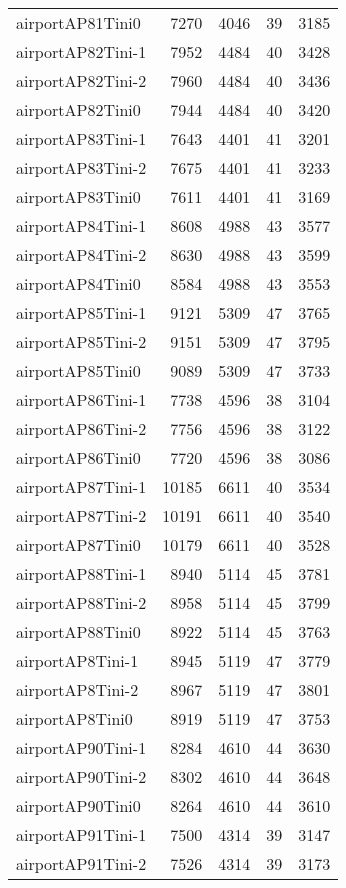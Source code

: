 \begin{longtable}{lrrrr}
airportAP81Tini0 & 7270 & 4046 & 39 & 3185 \\
airportAP82Tini-1 & 7952 & 4484 & 40 & 3428 \\
airportAP82Tini-2 & 7960 & 4484 & 40 & 3436 \\
airportAP82Tini0 & 7944 & 4484 & 40 & 3420 \\
airportAP83Tini-1 & 7643 & 4401 & 41 & 3201 \\
airportAP83Tini-2 & 7675 & 4401 & 41 & 3233 \\
airportAP83Tini0 & 7611 & 4401 & 41 & 3169 \\
airportAP84Tini-1 & 8608 & 4988 & 43 & 3577 \\
airportAP84Tini-2 & 8630 & 4988 & 43 & 3599 \\
airportAP84Tini0 & 8584 & 4988 & 43 & 3553 \\
airportAP85Tini-1 & 9121 & 5309 & 47 & 3765 \\
airportAP85Tini-2 & 9151 & 5309 & 47 & 3795 \\
airportAP85Tini0 & 9089 & 5309 & 47 & 3733 \\
airportAP86Tini-1 & 7738 & 4596 & 38 & 3104 \\
airportAP86Tini-2 & 7756 & 4596 & 38 & 3122 \\
airportAP86Tini0 & 7720 & 4596 & 38 & 3086 \\
airportAP87Tini-1 & 10185 & 6611 & 40 & 3534 \\
airportAP87Tini-2 & 10191 & 6611 & 40 & 3540 \\
airportAP87Tini0 & 10179 & 6611 & 40 & 3528 \\
airportAP88Tini-1 & 8940 & 5114 & 45 & 3781 \\
airportAP88Tini-2 & 8958 & 5114 & 45 & 3799 \\
airportAP88Tini0 & 8922 & 5114 & 45 & 3763 \\
airportAP8Tini-1 & 8945 & 5119 & 47 & 3779 \\
airportAP8Tini-2 & 8967 & 5119 & 47 & 3801 \\
airportAP8Tini0 & 8919 & 5119 & 47 & 3753 \\
airportAP90Tini-1 & 8284 & 4610 & 44 & 3630 \\
airportAP90Tini-2 & 8302 & 4610 & 44 & 3648 \\
airportAP90Tini0 & 8264 & 4610 & 44 & 3610 \\
airportAP91Tini-1 & 7500 & 4314 & 39 & 3147 \\
airportAP91Tini-2 & 7526 & 4314 & 39 & 3173 \\

\end{longtable}
